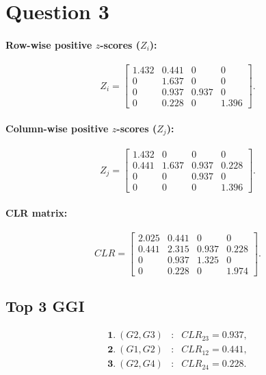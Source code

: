 \section*{Question 3}



\paragraph{Row-wise positive $z$-scores ($Z_i$):}
\[
    Z_i=
    \begin{bmatrix}
        1.432 & 0.441 & 0     & 0     \\
        0     & 1.637 & 0     & 0     \\
        0     & 0.937 & 0.937 & 0     \\
        0     & 0.228 & 0     & 1.396
    \end{bmatrix}.
\]

\paragraph{Column-wise positive $z$-scores ($Z_j$):}
\[
    Z_j=
    \begin{bmatrix}
        1.432 & 0     & 0     & 0     \\
        0.441 & 1.637 & 0.937 & 0.228 \\
        0     & 0     & 0.937 & 0     \\
        0     & 0     & 0     & 1.396
    \end{bmatrix}.
\]

\paragraph{CLR matrix:}
\[
    CLR=
    \begin{bmatrix}
        2.025 & 0.441 & 0     & 0     \\
        0.441 & 2.315 & 0.937 & 0.228 \\
        0     & 0.937 & 1.325 & 0     \\
        0     & 0.228 & 0     & 1.974
    \end{bmatrix}.
\]

\subsection*{Top 3 GGI}
\[
    \begin{array}{rcl}
        \textbf{1.}~(G2,G3) & : & CLR_{23}=0.937, \\[2pt]
        \textbf{2.}~(G1,G2) & : & CLR_{12}=0.441, \\[2pt]
        \textbf{3.}~(G2,G4) & : & CLR_{24}=0.228.
    \end{array}
\]
